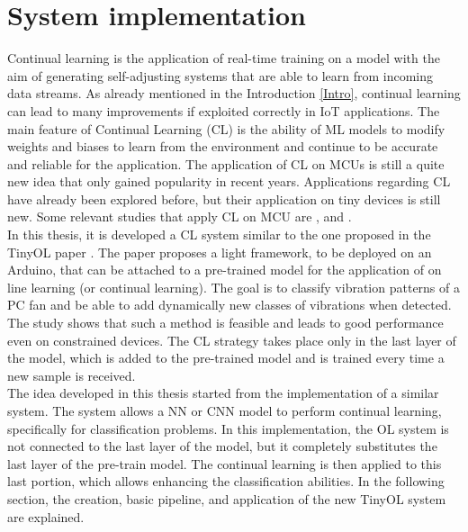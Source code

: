 \documentclass[12pt]{report}
\begin{document}
\chapter{System implementation}
Continual learning is the application of real-time training on a model with the aim of generating self-adjusting systems that are able to learn from incoming data streams. As already mentioned in the Introduction \ref{Intro}, continual learning can lead to many improvements if exploited correctly in IoT applications. The main feature of Continual Learning (CL) is the ability of ML models to modify weights and biases to learn from the environment and continue to be accurate and reliable for the application. The application of CL on MCUs is still a quite new idea that only gained popularity in recent years. Applications regarding CL have already been explored before, but their application on tiny devices is still new. Some relevant studies that apply CL on MCU are \autocite{ren2021tinyol}, \autocite{ren2021synergy} and \autocite{sudharsan2021train++}. \\
In this thesis, it is developed a CL system similar to the one proposed in the TinyOL paper \autocite{ren2021tinyol}. The paper proposes a light framework, to be deployed on an Arduino, that can be attached to a pre-trained model for the application of on line learning (or continual learning). The goal is to classify vibration patterns of a PC fan and be able to add dynamically new classes of vibrations when detected. The study shows that such a method is feasible and leads to good performance even on constrained devices. The CL strategy takes place only in the last layer of the model, which is added to the pre-trained model and is trained every time a new sample is received.\\
The idea developed in this thesis started from the implementation of a similar system. The system allows a NN or CNN model to perform continual learning, specifically for classification problems. In this implementation, the OL system is not connected to the last layer of the model, but it completely substitutes the last layer of the pre-train model. The continual learning is then applied to this last portion, which allows enhancing the classification abilities. In the following section, the creation, basic pipeline, and application of the new TinyOL system are explained. 
\end{document}
